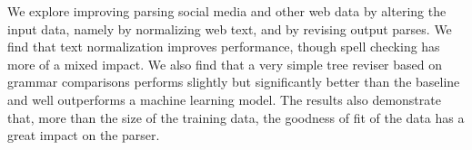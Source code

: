 We explore improving parsing social media and other web data by altering the input data, namely by normalizing web text, and by revising output parses.  We
 find that text normalization improves performance, though spell checking has
 more of a mixed impact.  We also find that a very simple tree reviser based on
 grammar comparisons performs slightly but significantly better than the
 baseline and well outperforms a machine learning model.  The results also
 demonstrate that, more              than the size of the training data, the goodness
 of fit
 of the data has a great impact on the parser.

